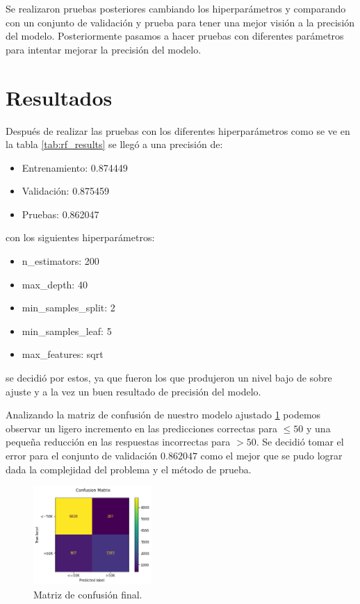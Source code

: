 \documentclass[twocolumn]{article}
\begin{document}
Se realizaron pruebas posteriores cambiando
los hiperparámetros y comparando con un conjunto de validación y prueba para tener 
una mejor visión a la precisión del modelo. Posteriormente pasamos a hacer pruebas
con diferentes parámetros para intentar mejorar la precisión del modelo.


\section{Resultados}
Después de realizar las pruebas con los diferentes hiperparámetros como se ve en
la tabla \ref{tab:rf_results} se llegó a una precisión de:

\begin{itemize}
  \item Entrenamiento: 0.874449 
  \item Validación: 0.875459 
  \item Pruebas: 0.862047
\end{itemize}
con los siguientes hiperparámetros:

\begin{itemize}
  \item n\_estimators: 200
  \item max\_depth: 40
  \item min\_samples\_split: 2
  \item min\_samples\_leaf: 5
  \item max\_features: sqrt
\end{itemize}
se decidió por estos, ya que fueron los que produjeron un nivel bajo de sobre ajuste
y a la vez un buen resultado de precisión del modelo.

Analizando la matriz de confusión de nuestro modelo ajustado \ref{fig:conf2}
podemos observar un ligero incremento en las predicciones correctas para $\leq50$
y una pequeña reducción en las respuestas incorrectas para $>50$. Se decidió tomar
el error para el conjunto de validación $0.862047$ como el mejor que se pudo lograr
dada la complejidad del problema y el método de prueba.

\begin{figure}[!ht]
\centering
\includegraphics[width=0.4\textwidth]{assets/conf2.png}
\caption{Matriz de confusión final.}
\label{fig:conf2}
\end{figure}
\end{document}
